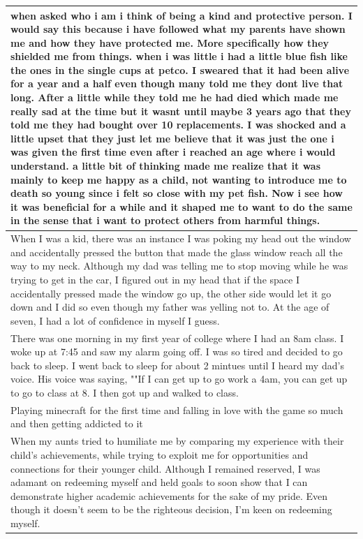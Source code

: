 \documentclass[
  .7em,
  letterpaper,
  DIV=11,
  numbers=noendperiod]{scrartcl}
\begin{document}
\begin{table}
\begin{tabular}{l}
\hline
when asked who i am i think of being a kind and protective person. I would say this because i have followed what my parents have shown me and how they have protected me. More specifically how they shielded me from things. when i was little i had a little blue fish like the ones in the single cups at petco. I sweared that it had been alive for a year and a half even though many told me they dont live that long. After a little while they told me he had died which made me really sad at the time but it wasnt until maybe 3 years ago that they told me they had bought over 10 replacements. I was shocked and a little upset that they just let me believe that it was just the one i was given the first time even after i reached an age where i would understand. a little bit of thinking made me realize that it was mainly to keep me happy as a child, not wanting to introduce me to death so young since i felt so close with my pet fish. Now i see how it was beneficial for a while and it shaped me to want to do the same in the sense that i want to protect others from harmful things.\\
\hline
When I was a kid, there was an instance I was poking my head out the window and accidentally pressed the button that made the glass window reach all the way to my neck. Although my dad was telling me to stop moving while he was trying to get in the car, I figured out in my head that if the space I accidentally pressed made the window go up, the other side would let it go down and I did so even though my father was yelling not to. At the age of seven, I had a lot of confidence in myself I guess.\\
\hline
There was one morning in my first year of college where I had an 8am class. I woke up at 7:45 and saw my alarm going off. I was so tired and decided to go back to sleep. I went back to sleep for about 2 mintues until I heard my dad's voice. His voice was saying, ""If I can get up to go work a 4am, you can get up to go to class at 8. I then got up and walked to class.\\
\hline
Playing minecraft for the first time and falling in love with the game so much and then getting addicted to it\\
\hline
When my aunts tried to humiliate me by comparing my experience with their child's achievements, while trying to exploit me for opportunities and connections for their younger child. Although I remained reserved, I was adamant on redeeming myself and held goals to soon show that I can demonstrate higher academic achievements for the sake of my pride. Even though it doesn't seem to be the righteous decision, I'm keen on redeeming myself.\\

\end{tabular}
\end{table}
\end{document}
